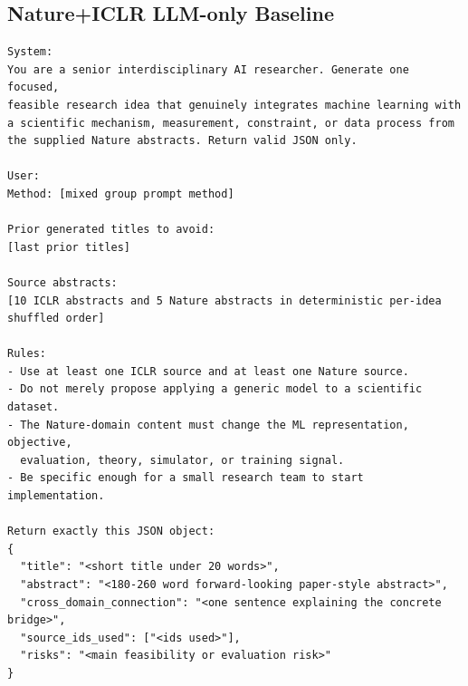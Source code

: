\documentclass[10pt,twocolumn]{article}
\begin{document}
\subsection{Nature+ICLR LLM-only Baseline}
\begin{lstlisting}[style=promptbox]
System:
You are a senior interdisciplinary AI researcher. Generate one focused,
feasible research idea that genuinely integrates machine learning with
a scientific mechanism, measurement, constraint, or data process from
the supplied Nature abstracts. Return valid JSON only.

User:
Method: [mixed group prompt method]

Prior generated titles to avoid:
[last prior titles]

Source abstracts:
[10 ICLR abstracts and 5 Nature abstracts in deterministic per-idea
shuffled order]

Rules:
- Use at least one ICLR source and at least one Nature source.
- Do not merely propose applying a generic model to a scientific dataset.
- The Nature-domain content must change the ML representation, objective,
  evaluation, theory, simulator, or training signal.
- Be specific enough for a small research team to start implementation.

Return exactly this JSON object:
{
  "title": "<short title under 20 words>",
  "abstract": "<180-260 word forward-looking paper-style abstract>",
  "cross_domain_connection": "<one sentence explaining the concrete bridge>",
  "source_ids_used": ["<ids used>"],
  "risks": "<main feasibility or evaluation risk>"
}
\end{lstlisting}
\end{document}
